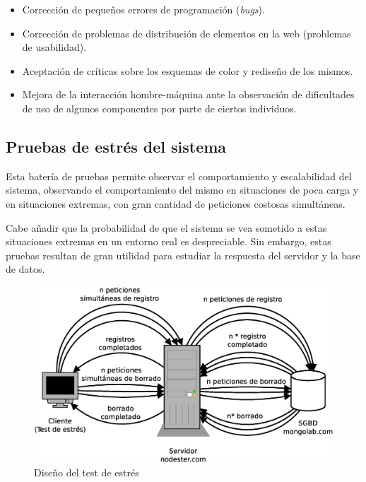 \begin{itemize}
\item Corrección de pequeños errores de programación (\emph{bugs}).
\item Corrección de problemas de distribución de elementos en la web (problemas de usabilidad).
\item Aceptación de críticas sobre los esquemas de color y rediseño de los mismos.
\item Mejora de la interacción hombre-máquina ante la observación de dificultades de uso de algunos componentes por parte de ciertos individuos.
\end{itemize}


\subsection{Pruebas de estrés del sistema}

Esta batería de pruebas permite observar el comportamiento y escalabilidad del sistema, observando el comportamiento del mismo en situaciones de poca carga y en situaciones extremas, con gran cantidad de peticiones costosas simultáneas.

Cabe añadir que la probabilidad de que el sistema se vea sometido a estas situaciones extremas en un entorno real es despreciable. Sin embargo, estas pruebas resultan de gran utilidad para estudiar la respuesta del servidor y la base de datos.

\begin{figure}[h]
  \begin{center}
    \includegraphics[width=\textwidth]{images/estres.eps}
    \caption{Diseño del test de estrés}
    \label{fig::estres}
  \end{center}
\end{figure}

